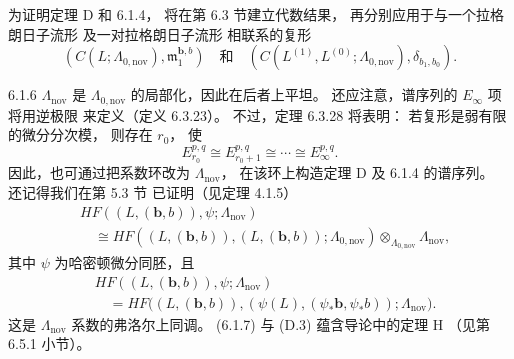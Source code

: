 为证明定理 D 和 6.1.4，
将在第 6.3 节建立代数结果，
再分别应用于与一个拉格朗日子流形
及一对拉格朗日子流形
相联系的复形
\[
(C(L;\Lambda_{0,\mathrm{nov}}),
\mathfrak m^{\mathbf b,b}_1)
\quad\text{和}\quad
(C(L^{(1)},L^{(0)};
\Lambda_{0,\mathrm{nov}}),
\delta_{b_1,b_0}).
\]

\begin{remark}{6.1.6}\label{rem:6-1-6}
$\Lambda_{\mathrm{nov}}$
是 $\Lambda_{0,\mathrm{nov}}$
的局部化，因此在后者上平坦。
还应注意，谱序列的
$E_\infty$ 项将用逆极限
来定义（定义 6.3.23）。
不过，定理 6.3.28 将表明：
若复形是弱有限的微分分次模，
则存在 $r_0$，
使
\[
E_{r_0}^{p,q}
\cong E_{r_0+1}^{p,q}
\cong\cdots
\cong E_\infty^{p,q}.
\]
因此，也可通过把系数环改为
$\Lambda_{\mathrm{nov}}$，
在该环上构造定理 D
及 6.1.4 的谱序列。
还记得我们在第 5.3 节
已证明（见定理 4.1.5）
\begin{equation}
\begin{aligned}
&HF((L,(\mathbf b,b)),\psi;
\Lambda_{\mathrm{nov}})\\
&\quad\cong
HF((L,(\mathbf b,b)),
(L,(\mathbf b,b));
\Lambda_{0,\mathrm{nov}})
\otimes_{\Lambda_{0,\mathrm{nov}}}
\Lambda_{\mathrm{nov}},
\end{aligned}
\tag{6.1.7}\label{eq:6-1-7}
\end{equation}
其中 $\psi$ 为哈密顿微分同胚，且
\begin{equation}
\begin{aligned}
&HF((L,(\mathbf b,b)),\psi;
\Lambda_{\mathrm{nov}})\\
&\quad=
HF\bigl(
(L,(\mathbf b,b)),
(\psi(L),(\psi_*\mathbf b,\psi_*b));
\Lambda_{\mathrm{nov}}
\bigr).
\end{aligned}
\tag{6.1.8}\label{eq:6-1-8}
\end{equation}
这是 $\Lambda_{\mathrm{nov}}$
系数的弗洛尔上同调。
(6.1.7) 与 \textup{(D.3)}
蕴含导论中的定理 H
（见第 6.5.1 小节）。
\end{remark}
